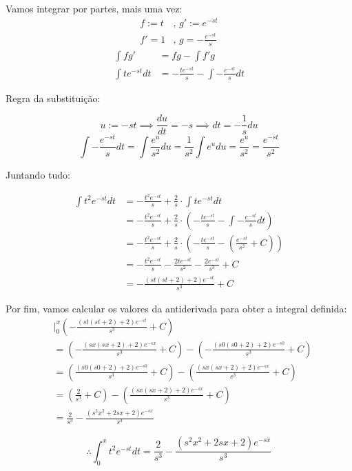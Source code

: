 \documentclass[12pt]{article}
\theoremstyle{definition}
\begin{document}
Vamos integrar por partes, mais uma vez:
\begin{align*}
	f := t & \text{, } g' := e^{-st}          \\
	f' = 1 & \text{, } g = -\frac{e^{-st}}{s} 
\end{align*}
\begin{align*}
	\int f g'
	  & = fg - \int f' g                                    \\
	\int{te^{-st}dt}
	  & = - \frac{te^{-st}}{s} - \int{-\frac{e^{-st}}{s}dt} 
\end{align*}

Regra da substituição:

\[
	u := -st \implies \frac{du}{dt} = -s \implies dt = -\frac{1}{s}du
\]
\[
	\int{-\frac{e^{-st}}{s}dt} = \int{\frac{e^u}{s^2}du} = \frac{1}{s^2}\int{e^u du} = \frac{e^u}{s^2} = \frac{e^{-st}}{s^2}
\]

Juntando tudo:

\begin{align*}
	\int{t^2 e^{-st} dt}
	  & = -\frac{t^2e^{-st}}{s} +\frac{2}{s} \cdot \int{te^{-st}dt}                                                         \\
	  & = -\frac{t^2e^{-st}}{s} +\frac{2}{s} \cdot \left(- \frac{te^{-st}}{s} - \int{-\frac{e^{-st}}{s}dt}\right)           \\
	  & = -\frac{t^2e^{-st}}{s} +\frac{2}{s} \cdot \left(- \frac{te^{-st}}{s} - \left(\frac{e^{-st}}{s^2} + C\right)\right) \\
	  & = -\frac{t^2e^{-st}}{s} - \frac{2te^{-st}}{s^2}-\frac{2e^{-st}}{s^3} + C                                            \\
	  & = - \frac{(st(st+2)+2)e^{-st}}{s^3}+C                                                                               
\end{align*}

Por fim, vamos calcular os valores da antiderivada para obter a integral definida:
\begin{align*}
	  & \bigg\rvert^x_0 \left(- \frac{(st(st+2)+2)e^{-st}}{s^3}+C\right)                                      \\
	  & = \left(- \frac{(sx(sx+2)+2)e^{-sx}}{s^3}+C\right) - \left(- \frac{(s0(s0+2)+2)e^{-s0}}{s^3}+C\right) \\
	  & = \left(\frac{(s0(s0+2)+2)e^{-s0}}{s^3}+C\right) - \left(\frac{(sx(sx+2)+2)e^{-sx}}{s^3}+C\right)     \\
	  & = \left(\frac{2}{s^3}+C\right) - \left(\frac{(sx(sx+2)+2)e^{-sx}}{s^3}+C\right)                       \\
	  & = \frac{2}{s^3}-\frac{(s^2x^2+2sx+2)e^{-sx}}{s^3}                                                     
\end{align*}

\[
	\boxed{
		\therefore \int^x_0{t^2 e^{-st} dt } = \frac{2}{s^3}-\frac{(s^2x^2+2sx+2)e^{-sx}}{s^3}
	}
\]
\end{document}
